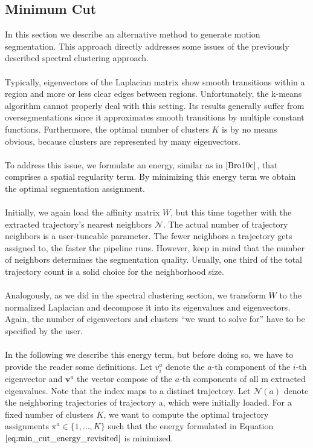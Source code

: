\subsection{Minimum Cut} 
\label{sec:min_cut_seg}
In this section we describe an alternative method to generate motion segmentation. This approach directly addresses some issues of the previously described spectral clustering approach. \\ \\
Typically, eigenvectors of the Laplacian matrix show smooth transitions within a region and more or less clear edges between regions. Unfortunately, the k-means algorithm cannot properly deal with this setting. Its results generally suffer from oversegmentations since it approximates smooth transitions by multiple constant functions. Furthermore, the optimal number of clusters $K$ is by no means obvious, because clusters are represented by many eigenvectors. \\ \\
To address this issue, we formulate an energy, similar as in $\cite{Bro10c}$, that comprises a spatial regularity term. By minimizing this energy term we obtain the optimal segmentation assignment. \\ \\
Initially, we again load the affinity matrix $W$, but this time together with the extracted trajectory's nearest neighbors $\mathcal{N}$. The actual number of trajectory neighbors is a user-tuneable parameter. The fewer neighbors a trajectory gets assigned to, the faster the pipeline runs. However, keep in mind that the number of neighbors determines the segmentation quality. Usually, one third of the total trajectory count is a solid choice for the neighborhood size. \\ \\ 
Analogously, as we did in the spectral clustering section, we transform $W$ to the normalized Laplacian and decompose it into its eigenvalues and eigenvectors. Again, the number of eigenvectors and clusters \enquote{we want to solve for} have to be specified by the user. \\ \\
In the following we describe this energy term, but before doing so, we have to provide the reader some definitions. Let $v_i^a$ denote the $a$-th component of the $i$-th eigenvector and $\textbf{v}^a$ the vector compose of the $a$-th components of all m extracted eigenvalues. Note that the index maps to a distinct trajectory. Let $\mathcal{N} \left( a \right)$ denote the neighboring trajectories of trajectory a, which were initially loaded. For a fixed number of clusters $K$, we want to compute the optimal trajectory assignments $\pi^{a} \in \{ 1, \dots , K \}$ such that the energy formulated in Equation $\ref{eq:min_cut_energy_revisited}$ is minimized.
